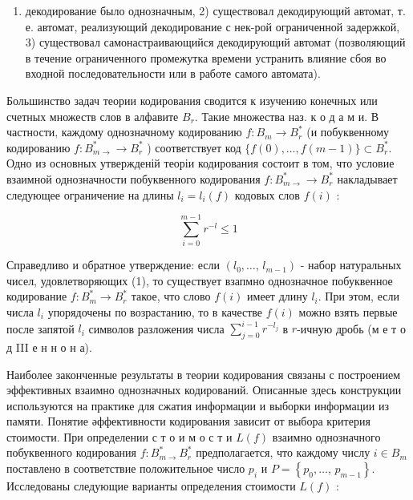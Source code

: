 \documentclass[10pt]{article}
\begin{document}
\begin{enumerate}

  \item декодирование было однозначным, 2) существовал декодирующий автомат, т. е. автомат, реализующий декодирование с нек-рой ограниченной задержкой, 3) существовал самонастраивающийся декодирующий автомат (позволяющий в течение ограниченного промежутка времени устранить влияние сбоя во входной последовательности или в работе самого автомата).

\end{enumerate}



Большинство задач теории кодирования сводится к изучению конечных или счетных множеств слов в алфавите $B_{r}$. Такие множества наз. к о д а м и. В частности, каждому однозначному кодированию $f: B_{m} \rightarrow B_{r}^{*}$ (и побуквенному кодированию $f: B_{m \rightarrow}^{*} \rightarrow B_{r}^{*}$ ) соответствует код $\{f(0), \ldots, f(m-1)\} \subset B_{r}^{*}$. Одно из основных утвержденій теоріи кодирования состоит в том, что условие взаимной однозначности побуквенного кодирования $f: B_{m \rightarrow}^{*} \rightarrow B_{r}^{*}$ накладывает следующее ограничение на длины $l_{i}=l_{i}(f)$ кодовых слов $f(i)$ :



\[

\sum_{i=0}^{m-1} r^{-l} \leqslant 1

\]



Справедливо и обратное утверждение: если $\left(l_{0}, \ldots\right.$, $\left.l_{m-1}\right)$ - набор натуральных чисел, удовлетворяющих (1), то существует взапмно однозначное побуквенное кодирование $f: B_{m}^{*} \rightarrow B_{r}^{*}$ такое, что слово $f(i)$ имеет длину $l_{i}$. При этом, если числа $l_{i}$ упорядочены по возрастанию, то в качестве $f(i)$ можно взять первые после запятой $l_{i}$ символов разложения числа $\sum_{j=0}^{i-1} r^{-l_{j}}$ в $r$-ичную дробь (м е т о д III е н н о н а).



Наиболее законченные результаты в теории кодирования связаны с построением эффективных взаимно однозначных кодирований. Описанные здесь конструкции используются на практике для сжатия информации и выборки информации из памяти. Понятие әффективности кодирования зависит от выбора критерия стоимости. При определении с т о и м о с т и $L(f)$ взаимно однозначного побуквенного кодирования $f: B_{m \rightarrow}^{*} B_{r}^{*}$ предполагается, что каждому числу $i \in B_{m}$ поставлено в соответствие положительное число $p_{i}$ и $P=\left\{p_{0}, \ldots\right.$, $\left.p_{m-1}\right\}$. Исследованы следующие варианты определения стоимости $L(f)$ :
\end{document}
